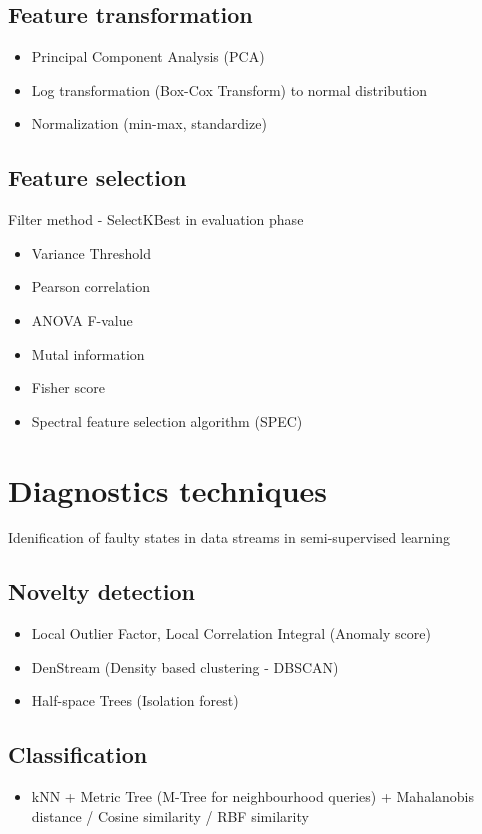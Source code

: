 \subsection{Feature transformation}
\begin{itemize}
\item Principal Component Analysis (PCA)
\item Log transformation (Box-Cox Transform) to normal distribution
\item Normalization (min-max, standardize) 
\end{itemize}

\subsection{Feature selection}
Filter method - SelectKBest  in evaluation phase
\begin{itemize}
\item Variance Threshold
\item Pearson correlation
\item ANOVA F-value
\item Mutal information
\item Fisher score
\item Spectral feature selection algorithm (SPEC)
\end{itemize}

\section{Diagnostics techniques}
Idenification of faulty states in data streams in semi-supervised learning
\subsection{Novelty detection}
\begin{itemize}
\item Local Outlier Factor, Local Correlation Integral (Anomaly score)
\item DenStream (Density based clustering - DBSCAN)
\item Half-space Trees (Isolation forest)
\end{itemize}

\subsection{Classification}
\begin{itemize}
\item kNN + Metric Tree (M-Tree for neighbourhood queries) + Mahalanobis distance / Cosine similarity /  RBF similarity
\end{itemize}


